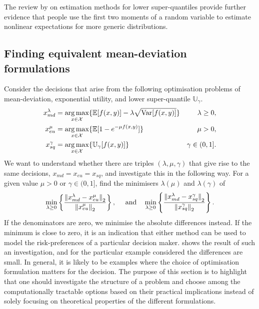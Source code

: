 \documentclass[main.tex]{subfiles}
\begin{document}
The review by \citet{nadarajah2014estimation} on estimation methods for
lower super-quantiles provide further evidence that people use
the first two moments of a random variable to estimate nonlinear
expectations for more generic distributions.


\subsection{Finding equivalent mean-deviation formulations}
Consider the decisions that arise from the following
optimisation problems of mean-deviation, exponential utility, and
lower super-quantile $\mathbb{U}_\gamma$.
\begin{subequations}\label{eq:optim_formulations}
  \begin{align}\label{eq:optim_formulations_md}
    x_{md}^\lambda
    &=\operatorname*{arg\,max}_{x\in\mathcal{X}}\{\mathbb{E}[f(x,y)]-\lambda\sqrt{\mbox{Var}[f(x,y)]}\}
    &\lambda\geq 0,\\\label{eq:optim_formulations_eu}
    x_{eu}^\mu
    &=\operatorname*{arg\,max}_{x\in\mathcal{X}}\{
      \mathbb{E}[1-e^{-\mu f(x,y)}]\}
    &\mu>0,\\\label{eq:optim_formulations_sq}
    x_{sq}^\gamma
    &=\operatorname*{arg\,max}_{x\in\mathcal{X}}
      \{\mathbb{U}_\gamma[f(x,y)]\}
    &\gamma\in(0,1].
  \end{align}
\end{subequations}
We want to understand whether there are triples $(\lambda,\mu,\gamma)$ that give rise
to the same decisions, $x_{md}=x_{eu}=x_{sq}$, and investigate this in
the following way.
For a given value $\mu>0$ or $\gamma\in(0,1]$, find the minimisers
$\lambda(\mu)$ and $\lambda(\gamma)$ of
\begin{equation}\label{eq:min_xmd_xeu_xsq}
  \min_{\lambda\geq 0}\left\{\frac{{\|x_{md}^\lambda-x_{eu}^\mu\|}_2}{{{\|x_{eu}^\mu}\|}_2}\right\},\quad
  \textnormal{ and}\quad
  \min_{\lambda\geq 0}\left\{\frac{{\|x_{md}^\lambda-x_{sq}^\gamma\|}_2}{{{\|x_{sq}^\gamma}\|}_2}\right\}.
\end{equation}
If the denominators are zero, we minimise the absolute differences instead.
If the minimum is close to zero, it is an indication that either method
can be used to model the risk-preferences of a particular decision maker.
 shows the result of such an investigation,
and for the particular example considered the differences are small.
In general, it is likely to be examples where the choice of
optimisation formulation matters for the decision. The purpose of this
section is to highlight that one should investigate the structure of
a problem and choose among the computationally tractable options based
on their practical implications instead of solely focusing on
theoretical properties of the different formulations.
\end{document}
